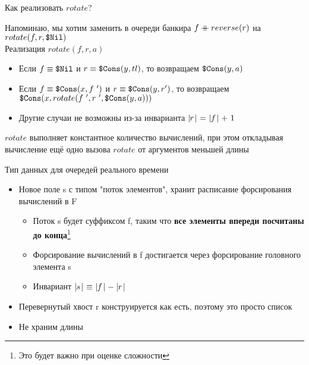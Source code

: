 \begin{frame}{Как реализовать $rotate$?}

Напоминаю, мы хотим заменить в очереди банкира $f\mathbin{+\mkern-10mu+} reverse(r)$ на $rotate(f,r,\texttt{\$Nil})$\\

Реализация $rotate(f,r,a)$
\begin{itemize}
\item Если $f\equiv\texttt{\$Nil}$ и $r\equiv\texttt{\$Cons}(y,tl)$, то возвращаем $\texttt{\$Cons}(y,a)$
\item Если $f\equiv\texttt{\$Cons}(x,f\ ')$ и $r\equiv\texttt{\$Cons}(y,r')$, то возвращаем $\texttt{\$Cons}(x,rotate(f\ ', r\ ', \texttt{\$Cons}(y,a)))$
\item Другие случаи не возможны из-за инварианта $\mid\!\!r\!\mid\ =\ \mid\!\!f\!\mid +\ 1$
\end{itemize}

\begin{remark}
$rotate$ выполняет константное количество вычислений, при этом откладывая вычисление ещё одно вызова $rotate$ от аргументов меньшей длины
\end{remark}
\end{frame}

\def\invariant{$\card{s}\ \equiv\ \card{f}-\card{r}$}
\def\rotate{\ensuremath{rotate}}

\begin{frame}[fragile]{Тип данных для очередей реального времени}


\begin{itemize}
\item Новое поле s с типом "поток элементов", хранит расписание форсирования вычислений в F
\begin{itemize}
\item Поток s будет суффиксом f, таким что \textbf{все элементы впереди посчитаны до конца}\footnote{Это будет важно при оценке сложности}
\item Форсирование вычислений в f достигается через форсирование головного элемента s
\item Инвариант \invariant
\end{itemize}
\item Перевернутый хвост r конструируется как есть, поэтому это просто список
\item Не храним длины 
\end{itemize}
\end{frame}

